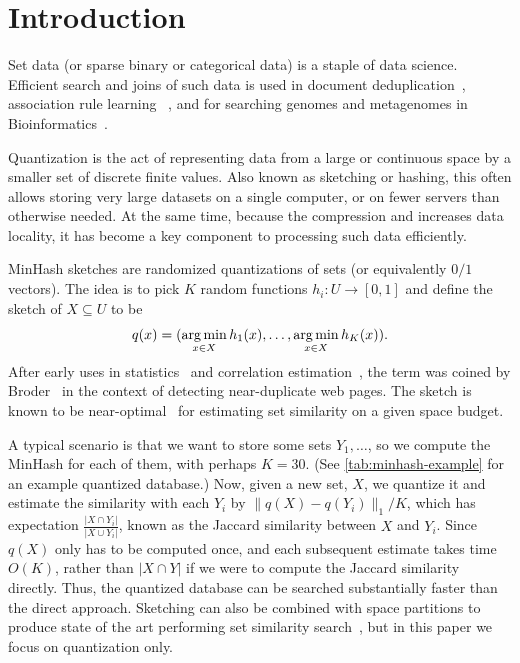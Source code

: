 
\section{Introduction}
Set data (or sparse binary or categorical data) is a staple of data science.
Efficient search and joins of such data is used in document deduplication~\cite{broder1997syntactic}, association rule learning ~\cite{zheng2001real}, and 
for searching genomes and metagenomes in Bioinformatics~\cite{ondov2016mash}.

Quantization is the act of representing data from a large or continuous space by a smaller set of discrete finite values.
Also known as sketching or hashing, this often allows storing very large datasets on a single computer, or on fewer servers than otherwise needed.
At the same time, because the compression and increases data locality, it has become a key component to processing such data efficiently.


MinHash sketches are randomized quantizations of sets (or equivalently $0/1$ vectors).
The idea is to pick $K$ random functions $h_i : U \to [0,1]$ and define the sketch of $X\subseteq U$ to be
\[q(x) = (\operatorname*{arg\,min}_{x\in X}h_1(x), \dots, \operatorname*{arg\,min}_{x\in X}h_K(x)).\]
After early uses in statistics~\cite{brewer1972selecting} and correlation estimation~\cite{flajolet1985probabilistic}, the term was coined by Broder~\cite{broder1997resemblance, broder1997syntactic} in the context of detecting near-duplicate web pages.
The sketch is known to be near-optimal~\cite{pagh2014min} for estimating set similarity on a given space budget.

A typical scenario is that we want to store some sets $Y_1, \dots$, so we compute the MinHash for each of them, with perhaps $K=30$.
(See \cref{tab:minhash-example} for an example quantized database.)
Now, given a new set, $X$, we quantize it and estimate the similarity with each $Y_i$ by $\|q(X)-q(Y_i)\|_1/K$, which has expectation $\frac{|X\cap Y_i|}{|X\cup Y_i|}$, known as the Jaccard similarity between $X$ and $Y_i$.
Since $q(X)$ only has to be computed once, and each subsequent estimate takes time $O(K)$, rather than $|X \cap Y|$ if we were to compute the Jaccard similarity directly.
Thus, the quantized database can be searched substantially faster than the direct approach.
Sketching can also be combined with space partitions to produce state of the art performing set similarity search~\cite{christiani2018scalable}, but in this paper we focus on quantization only.

